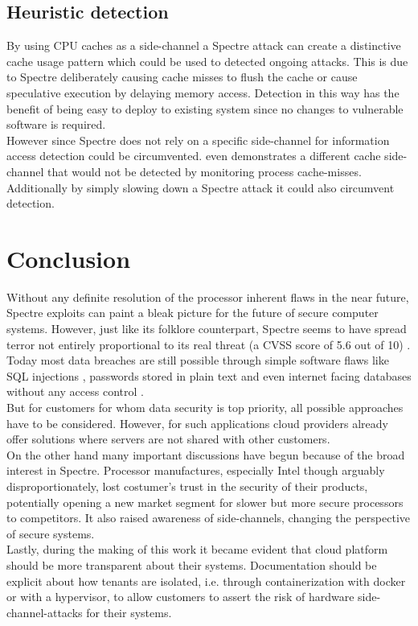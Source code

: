 \documentclass[conference,compsoc,final,a4paper]{IEEEtran}
\begin{document}
\subsection{Heuristic detection}
By using CPU caches as a side-channel a Spectre attack can create a distinctive cache usage pattern which could be used to detected ongoing attacks. \cite{depoix2018} This is due to Spectre deliberately causing cache misses to flush the cache or cause speculative execution by delaying memory access. Detection in this way has the benefit of being easy to deploy to existing system since no changes to vulnerable software is required. \cite{depoix2018, chiappetta2016real} \\
However since Spectre does not rely on a specific side-channel for information access \cite{kocher2018spectre} detection could be circumvented. \textcite{gruss2016flush+} even demonstrates a different cache side-channel that would not be detected by monitoring process cache-misses. \\
Additionally by simply slowing down a Spectre attack it could also circumvent detection. \cite{chiappetta2016real}
\section{Conclusion}
Without any definite resolution of the processor inherent flaws in the near future, Spectre exploits can paint a bleak picture for the future of secure computer systems. However, just like its folklore counterpart, Spectre seems to have spread terror not entirely proportional to its real threat (a \ac{CVSS} score of 5.6 out of 10) \cite{cveSpectre}. \\
Today most data breaches are still possible through simple software flaws like SQL injections \cite{magnetoSQLi}, passwords stored in plain text \cite{facebookPlainText} and even internet facing databases without any access control \cite{unistellarMongoDB}. \\
But for customers for whom data security is top priority, all possible approaches have to be considered. However, for such applications cloud providers already offer solutions where servers are not shared with other customers. \cite{AWSDedicated} \\
On the other hand many important discussions have begun because of the broad interest in Spectre. Processor manufactures, especially Intel though arguably disproportionately, lost costumer's trust in the security of their products, potentially opening a new market segment for slower but more secure processors to competitors. It also raised awareness of side-channels, changing the perspective of secure systems. \\
Lastly, during the making of this work it became evident that cloud platform should be more transparent about their systems. Documentation should be explicit about how tenants are isolated, i.e. through containerization with docker or with a hypervisor, to allow customers to assert the risk of hardware side-channel-attacks for their systems.
\end{document}
